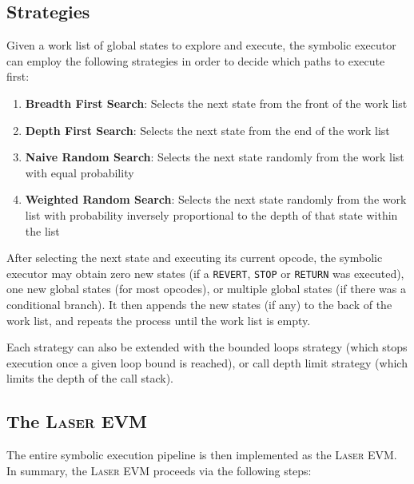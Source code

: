 \subsection{Strategies}

Given a work list of global states to explore and execute, the symbolic executor can employ the following strategies
in order to decide which paths to execute first:

\begin{enumerate}
    \item \textbf{Breadth First Search}: 
    Selects the next state from the front of the work list
    

    \item \textbf{Depth First Search}: 
    Selects the next state from the end of the work list

    \item \textbf{Naive Random Search}: 
    Selects the next state randomly from the work list with equal probability

    \item \textbf{Weighted Random Search}: 
    Selects the next state randomly from the work list with probability inversely proportional to
    the depth of that state within the list
\end{enumerate}

After selecting the next state and executing its current opcode, the symbolic executor may obtain 
zero new states (if a \texttt{REVERT}, \texttt{STOP} or \texttt{RETURN} was executed), one new global states (for most opcodes), 
or multiple global states (if there was a conditional branch). It then appends the new states (if any) to the back 
of the work list, and repeats the process until the work list is empty.

Each strategy can also be extended with the bounded loops strategy (which stops execution once a given 
loop bound is reached), or call depth limit strategy (which limits the depth of the call stack).

\subsection{The \textsc{Laser} EVM}

The entire symbolic execution pipeline is then implemented as the \textsc{Laser} EVM. 
In summary, the \textsc{Laser} EVM proceeds via the
following steps:

